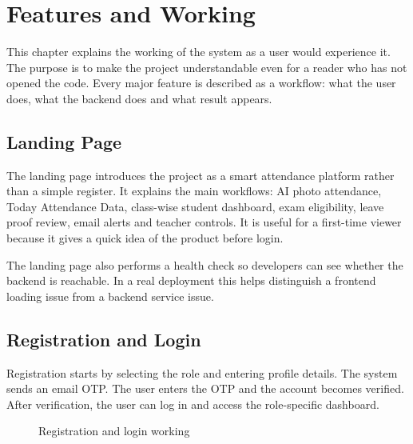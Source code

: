 \chapter{Features and Working}
\label{chap:features}

This chapter explains the working of the system as a user would experience it. The purpose is to make the project understandable even for a reader who has not opened the code. Every major feature is described as a workflow: what the user does, what the backend does and what result appears.

\section{Landing Page}

The landing page introduces the project as a smart attendance platform rather than a simple register. It explains the main workflows: AI photo attendance, Today Attendance Data, class-wise student dashboard, exam eligibility, leave proof review, email alerts and teacher controls. It is useful for a first-time viewer because it gives a quick idea of the product before login.

The landing page also performs a health check so developers can see whether the backend is reachable. In a real deployment this helps distinguish a frontend loading issue from a backend service issue.

\section{Registration and Login}

Registration starts by selecting the role and entering profile details. The system sends an email OTP. The user enters the OTP and the account becomes verified. After verification, the user can log in and access the role-specific dashboard.

\begin{figure}[H]
\centering
{}
\caption{Registration and login working}
\label{fig:registration-working}
\end{figure}

